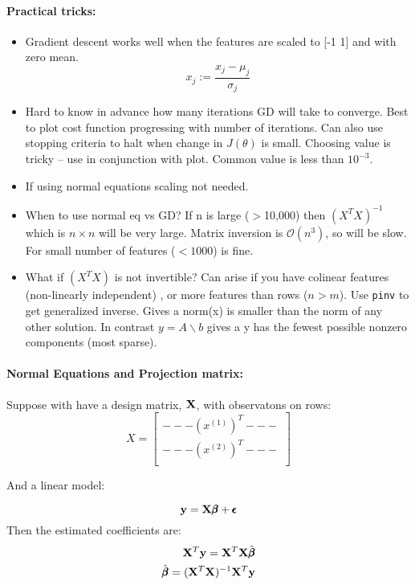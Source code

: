 \documentclass[12pt]{article}
\begin{document}
\paragraph{Practical tricks:} 
\begin{itemize}
\item Gradient descent works well when the features are scaled to [-1 1] and with zero mean. 
\[
x_j := \frac{x_j - \mu_j}{\sigma_j}
\]

\item Hard to know in advance how many iterations GD will take to converge. Best to plot cost function progressing with number of iterations. Can also use stopping criteria to halt when change in $J(\theta)$ is small. Choosing value is tricky -- use in conjunction with plot. Common value is less than $10^{-3}$. 

\item If using normal equations scaling not needed. 

\item When to use normal eq vs GD? If n is large ($>$10,000) then $(X^T X)^{-1}$ which is $n \times n$ will be very large. Matrix inversion is $\mathcal O(n^3)$, so will be slow. For small number of features ($<1000$) is  fine. 

\item What if $(X^T X)$ is not invertible? Can arise if you have colinear features (non-linearly independent) , or more features than rows ($n > m$). Use \texttt{pinv} to get generalized inverse. Gives a norm(x) is smaller than the norm of any other solution. In contrast $y = A\backslash b$ gives a y has the fewest possible nonzero components (most sparse).

\end{itemize}



\paragraph{Normal Equations and Projection matrix:} Suppose with have a design matrix, $\mathrm{\mathbf{X}}$, with observatons on rows:
\[
X = 
\begin{bmatrix}
{ --- \left( x^{(1)} \right)^T --- }\\[0.5em]
{ --- \left( x^{(2)} \right)^T --- }\\
\end{bmatrix}
\]

And a linear model: 

\[ \mathbf{y} = \mathrm{\mathbf{X}} \pmb \beta + \pmb\epsilon \]
Then the estimated coefficients are:
\begin{align*}
\mathrm{\mathbf{X}}^T \mathbf{y} = \mathrm{\mathbf{X}}^T \mathrm{\mathbf{X}} \hat{{\pmb{\beta} }} \\
\hat{{\pmb{\beta} }} = (\mathrm{\mathbf{X}}^T \mathrm{\mathbf{X}})^{-1}\mathrm{\mathbf{X}}^T \mathbf{y}  
\end{align*}
\end{document}
